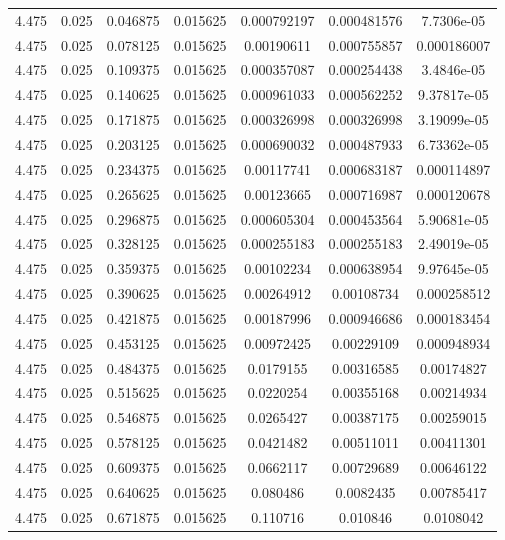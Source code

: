 \begin{table}[bh]
\begin{center}
{\begin{tabular}{ccccccc}
4.475	 & 0.025 & 	0.046875	 & 0.015625	 & 0.000792197	 & 0.000481576	 & 7.7306e-05 \\ 
4.475	 & 0.025 & 	0.078125	 & 0.015625	 & 0.00190611	 & 0.000755857	 & 0.000186007 \\ 
4.475	 & 0.025 & 	0.109375	 & 0.015625	 & 0.000357087	 & 0.000254438	 & 3.4846e-05 \\ 
4.475	 & 0.025 & 	0.140625	 & 0.015625	 & 0.000961033	 & 0.000562252	 & 9.37817e-05 \\ 
4.475	 & 0.025 & 	0.171875	 & 0.015625	 & 0.000326998	 & 0.000326998	 & 3.19099e-05 \\ 
4.475	 & 0.025 & 	0.203125	 & 0.015625	 & 0.000690032	 & 0.000487933	 & 6.73362e-05 \\ 
4.475	 & 0.025 & 	0.234375	 & 0.015625	 & 0.00117741	 & 0.000683187	 & 0.000114897 \\ 
4.475	 & 0.025 & 	0.265625	 & 0.015625	 & 0.00123665	 & 0.000716987	 & 0.000120678 \\ 
4.475	 & 0.025 & 	0.296875	 & 0.015625	 & 0.000605304	 & 0.000453564	 & 5.90681e-05 \\ 
4.475	 & 0.025 & 	0.328125	 & 0.015625	 & 0.000255183	 & 0.000255183	 & 2.49019e-05 \\ 
4.475	 & 0.025 & 	0.359375	 & 0.015625	 & 0.00102234	 & 0.000638954	 & 9.97645e-05 \\ 
4.475	 & 0.025 & 	0.390625	 & 0.015625	 & 0.00264912	 & 0.00108734	 & 0.000258512 \\ 
4.475	 & 0.025 & 	0.421875	 & 0.015625	 & 0.00187996	 & 0.000946686	 & 0.000183454 \\ 
4.475	 & 0.025 & 	0.453125	 & 0.015625	 & 0.00972425	 & 0.00229109	 & 0.000948934 \\ 
4.475	 & 0.025 & 	0.484375	 & 0.015625	 & 0.0179155	 & 0.00316585	 & 0.00174827 \\ 
4.475	 & 0.025 & 	0.515625	 & 0.015625	 & 0.0220254	 & 0.00355168	 & 0.00214934 \\ 
4.475	 & 0.025 & 	0.546875	 & 0.015625	 & 0.0265427	 & 0.00387175	 & 0.00259015 \\ 
4.475	 & 0.025 & 	0.578125	 & 0.015625	 & 0.0421482	 & 0.00511011	 & 0.00411301 \\ 
4.475	 & 0.025 & 	0.609375	 & 0.015625	 & 0.0662117	 & 0.00729689	 & 0.00646122 \\ 
4.475	 & 0.025 & 	0.640625	 & 0.015625	 & 0.080486	 & 0.0082435	 & 0.00785417 \\ 
4.475	 & 0.025 & 	0.671875	 & 0.015625	 & 0.110716	 & 0.010846	 & 0.0108042 \\ 

\end{tabular}}
\end{center}
\end{table}
